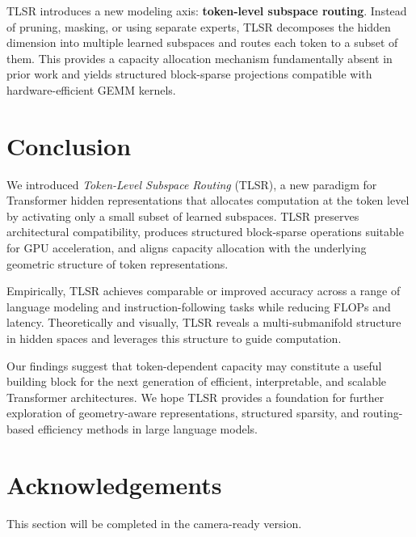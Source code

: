 \documentclass{article}
\theoremstyle{plain}
\theoremstyle{definition}
\theoremstyle{remark}
\begin{document}
TLSR introduces a new modeling axis: \textbf{token-level subspace routing}.
Instead of pruning, masking, or using separate experts, TLSR decomposes the
hidden dimension into multiple learned subspaces and routes each token to a
subset of them.
This provides a capacity allocation mechanism fundamentally absent in prior
work and yields structured block-sparse projections compatible with
hardware-efficient GEMM kernels.


\section{Conclusion}

We introduced \emph{Token-Level Subspace Routing} (TLSR), a new paradigm for
Transformer hidden representations that allocates computation at the token level
by activating only a small subset of learned subspaces.
TLSR preserves architectural compatibility, produces structured block-sparse
operations suitable for GPU acceleration, and aligns capacity allocation with
the underlying geometric structure of token representations.

Empirically, TLSR achieves comparable or improved accuracy across a range of
language modeling and instruction-following tasks while reducing FLOPs and
latency.
Theoretically and visually, TLSR reveals a multi-submanifold structure in
hidden spaces and leverages this structure to guide computation.

Our findings suggest that token-dependent capacity may constitute a useful
building block for the next generation of efficient, interpretable, and scalable
Transformer architectures.
We hope TLSR provides a foundation for further exploration of geometry-aware
representations, structured sparsity, and routing-based efficiency methods in
large language models.



\section*{Acknowledgements}
This section will be completed in the camera-ready version. 
\end{document}
